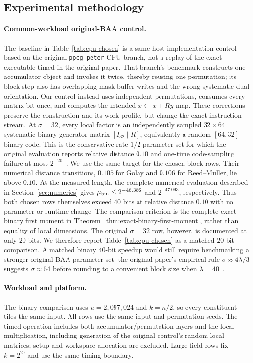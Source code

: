 \documentclass[runningheads,envcountsame,envcountsect]{llncs}
\begin{document}
\subsection{Experimental methodology}

\paragraph{Common-workload original-BAA control.}
The baseline in Table~\ref{tab:cpu-chosen} is a same-host implementation control
based on the original \texttt{ppcg-peter} CPU branch, not a replay of the exact
executable timed in the original paper.  That branch's benchmark constructs one
accumulator object and invokes it twice, thereby reusing one permutation; its
block step also has overlapping mask-buffer writes and the wrong
systematic-dual orientation.  Our control instead uses independent permutations,
consumes every matrix bit once, and computes the intended
$x\leftarrow x+Ry$ map.  These corrections preserve the construction and its
work profile, but change the exact instruction stream.  At $\sigma=32$, every
local factor is an independently sampled
$32\times64$ systematic binary generator matrix $[I_{32}\mid R]$, equivalently
a random $[64,32]$ binary code.  This is the conservative rate-$1/2$ parameter set for which
the original evaluation reports relative distance $0.10$ and one-time
code-sampling failure at most $2^{-20}$~\cite{baa26}.  We use the same target
for the chosen-block rows.  Their numerical distance transitions,
 $0.105$ for Golay and $0.106$ for Reed--Muller, lie above $0.10$.  At the
 measured length, the complete numerical evaluation described in
 Section~\ref{sec:numerics} gives
 $\mu_{\rm bin}\le2^{-46.386}$ and $2^{-47.093}$, respectively.  Thus both
 chosen rows themselves exceed $40$ bits at relative distance $0.10$ with no
 parameter or runtime change.  The comparison criterion is the complete exact
 binary first moment in Theorem~\ref{thm:exact-binary-first-moment}, rather than
 equality of local dimensions.  The original $\sigma=32$ row, however, is
 documented at only $20$ bits.  We therefore report
 Table~\ref{tab:cpu-chosen} as a matched $20$-bit comparison.  A matched binary
 $40$-bit speedup would still require benchmarking a stronger original-BAA
 parameter set; the original paper's empirical rule
 $\sigma\approx4\lambda/3$ suggests $\sigma\approx54$ before rounding to a
 convenient block size when $\lambda=40$~\cite{baa26}.

\paragraph{Workload and platform.}
The binary comparison uses $n=2{,}097{,}024$ and $k=n/2$, so every constituent
tiles the same input.  All rows use the same input and permutation seeds.
The timed operation includes both accumulator/permutation layers and the
local multiplication, including generation of the original control's random
local matrices; setup and workspace allocation are excluded.
Large-field rows fix $k=2^{20}$ and use the same timing boundary.
\end{document}
